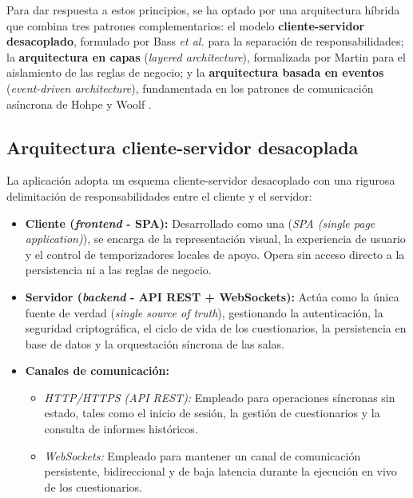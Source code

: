 Para dar respuesta a estos principios, se ha optado por una arquitectura híbrida que combina tres patrones complementarios: el modelo \textbf{cliente-servidor desacoplado}, formulado por Bass \textit{et al.} \cite{bass2012software} para la separación de responsabilidades; la \textbf{arquitectura en capas} (\textit{layered architecture}), formalizada por Martin \cite{martin2017clean} para el aislamiento de las reglas de negocio; y la \textbf{arquitectura basada en eventos} (\textit{event-driven architecture}), fundamentada en los patrones de comunicación asíncrona de Hohpe y Woolf \cite{hohpe2004enterprise}.

\subsection{Arquitectura cliente-servidor desacoplada}

La aplicación adopta un esquema cliente-servidor desacoplado con una rigurosa delimitación de responsabilidades entre el cliente y el servidor:

\begin{itemize}
    \item \textbf{Cliente (\textit{frontend} - SPA):} Desarrollado como una (\textit{SPA (single page application)}), se encarga de la representación visual, la experiencia de usuario y el control de temporizadores locales de apoyo. Opera sin acceso directo a la persistencia ni a las reglas de negocio.
    \item \textbf{Servidor (\textit{backend} - API REST + WebSockets):} Actúa como la única fuente de verdad (\textit{single source of truth}), gestionando la autenticación, la seguridad criptográfica, el ciclo de vida de los cuestionarios, la persistencia en base de datos y la orquestación síncrona de las salas.
    \item \textbf{Canales de comunicación:}
    \begin{itemize}
        \item \textit{HTTP/HTTPS (API REST):} Empleado para operaciones síncronas sin estado, tales como el inicio de sesión, la gestión de cuestionarios y la consulta de informes históricos.
        \item \textit{WebSockets:} Empleado para mantener un canal de comunicación persistente, bidireccional y de baja latencia durante la ejecución en vivo de los cuestionarios.
    \end{itemize}
\end{itemize}

